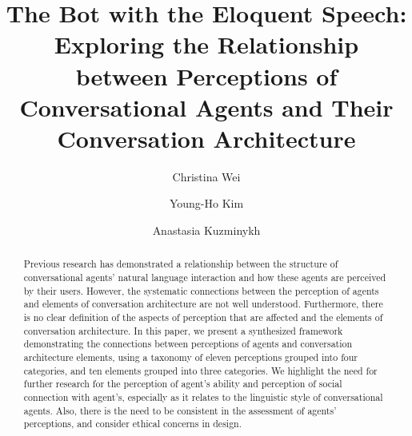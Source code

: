 \documentclass[sigconf,screen,review, anonymous]{acmart}
\begin{document}

\title[The Bot with the Eloquent Speech]{The Bot with the Eloquent Speech: Exploring the Relationship between Perceptions of Conversational Agents and Their Conversation Architecture}

\author{Christina Wei}

\author{Young-Ho Kim}

\author{Anastasia Kuzminykh}

\renewcommand{\shortauthors}{Wei, Kim, and Kuzminykh}

\begin{abstract}
Previous research has demonstrated a relationship between the structure of conversational agents' natural language interaction and how these agents are perceived by their users. However, the systematic connections between the perception of agents and elements of conversation architecture are not well understood. Furthermore, there is no clear definition of the aspects of perception that are affected and the elements of conversation architecture. In this paper, we present a synthesized framework demonstrating the connections between perceptions of agents and conversation architecture elements, using a taxonomy of eleven perceptions grouped into four categories, and ten elements grouped into three categories. We highlight the need for further research for the perception of agent's ability and perception of social connection with agent's, especially as it relates to the linguistic style of conversational agents.  Also, there is the need to be consistent in the assessment of agents' perceptions, and consider ethical concerns in design.
\end{abstract}
\end{document}
